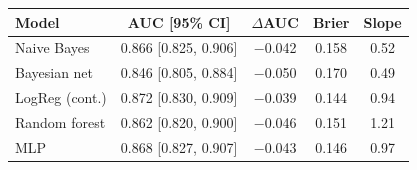 \begin{tabular}{lcccc}
\toprule
Model & AUC [95\% CI] & $\Delta$AUC & Brier & Slope \\
\midrule
Naive Bayes & 0.866 [0.825, 0.906] & $-$0.042 & 0.158 & 0.52 \\
Bayesian net & 0.846 [0.805, 0.884] & $-$0.050 & 0.170 & 0.49 \\
LogReg (cont.) & 0.872 [0.830, 0.909] & $-$0.039 & 0.144 & 0.94 \\
Random forest & 0.862 [0.820, 0.900] & $-$0.046 & 0.151 & 1.21 \\
MLP & 0.868 [0.827, 0.907] & $-$0.043 & 0.146 & 0.97 \\
\bottomrule
\end{tabular}
